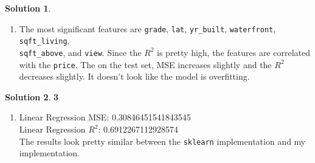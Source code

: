 \documentclass[11pt]{article}
\theoremstyle{definition}
\theoremstyle{nopunct}
\newtheorem*{s}{Solution}
\begin{document}
\begin{s}
\begin{enumerate}
        \item The most significant features are \texttt{grade}, \texttt{lat}, 
            \texttt{yr\_built}, \texttt{waterfront},
            \texttt{sqft\_living}, \\
            \texttt{sqft\_above}, and \texttt{view}.
            Since the $R^2$ is pretty high, the features are correlated with the \texttt{price}.
            The on the test set, MSE increases slightly and the $R^2$ decreases slightly.
            It doesn't look like the model is overfitting.

    \end{enumerate}
\end{s}

\vspace{10pt}

\begin{s}\textbf{3}
    \begin{enumerate} 
        \item Linear Regression MSE: 0.30846451541843545 \\
                Linear Regression $R^2$: 0.6912267112928574 \\
                The results look pretty similar between the \texttt{sklearn} implementation 
                and my implementation.
    \end{enumerate}
\end{s}
\end{document}
